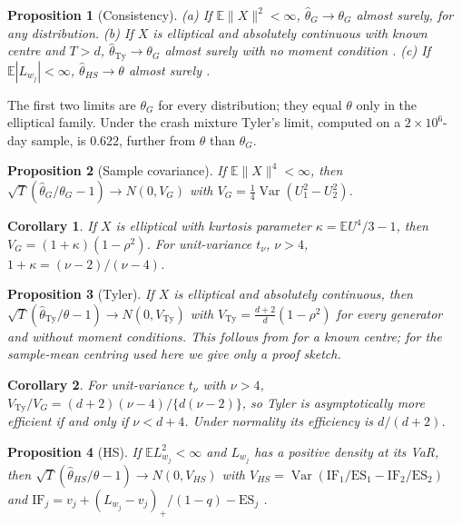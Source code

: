 \documentclass[11pt]{article}
\newcommand{\E}{\mathbb{E}}
\newcommand{\ES}{\mathrm{ES}}
\newcommand{\Var}{\operatorname{Var}}
\newtheorem{proposition}{Proposition}
\newtheorem{corollary}{Corollary}
\theoremstyle{remark}
\begin{document}
\begin{proposition}[Consistency]\label{prop:cons}
(a) If $\E\|X\|^2<\infty$, $\hat\theta_G\to\theta_G$ almost surely, for any distribution.
(b) If $X$ is elliptical and absolutely continuous with known centre and $T>d$, $\hat\theta_{\mathrm{Ty}}\to\theta_G$
almost surely with no moment condition \citep{tyler1987}.
(c) If $\E|L_{w_j}|<\infty$, $\hat\theta_{HS}\to\theta$ almost surely \citep{acerbi2002}.
\end{proposition}

The first two limits are $\theta_G$ for every distribution; they equal $\theta$ only in the elliptical family.
Under the crash mixture Tyler's limit, computed on a $2\times10^6$-day sample, is $0.622$, further from $\theta$
than $\theta_G$.

\begin{proposition}[Sample covariance]\label{prop:clt}
If $\E\|X\|^4<\infty$, then $\sqrt T(\hat\theta_G/\theta_G-1)\to N(0,V_G)$ with $V_G=\frac14\Var(U_1^2-U_2^2)$.
\end{proposition}

\begin{corollary}\label{cor:vg}
If $X$ is elliptical with kurtosis parameter $\kappa=\E U^4/3-1$, then $V_G=(1+\kappa)(1-\rho^2)$. For unit-variance
$t_\nu$, $\nu>4$, $1+\kappa=(\nu-2)/(\nu-4)$.
\end{corollary}

\begin{proposition}[Tyler]\label{prop:tyler}
If $X$ is elliptical and absolutely continuous, then $\sqrt T(\hat\theta_{\mathrm{Ty}}/\theta-1)\to
N(0,V_{\mathrm{Ty}})$ with $V_{\mathrm{Ty}}=\frac{d+2}d(1-\rho^2)$ for every generator and without moment
conditions. This follows from \citet{tyler1987} for a known centre; for the sample-mean centring used here we
give only a proof sketch.
\end{proposition}

\begin{corollary}\label{cor:eff}
For unit-variance $t_\nu$ with $\nu>4$, $V_{\mathrm{Ty}}/V_G=(d+2)(\nu-4)/\{d(\nu-2)\}$, so Tyler is
asymptotically more efficient if and only if $\nu<d+4$. Under normality its efficiency is $d/(d+2)$.
\end{corollary}

\begin{proposition}[HS]\label{prop:hs}
If $\E L_{w_j}^2<\infty$ and $L_{w_j}$ has a positive density at its VaR, then
$\sqrt T(\hat\theta_{HS}/\theta-1)\to N(0,V_{HS})$ with $V_{HS}=\Var(\mathrm{IF}_1/\ES_1-\mathrm{IF}_2/\ES_2)$
and $\mathrm{IF}_j=v_j+(L_{w_j}-v_j)_+/(1-q)-\ES_j$ \citep{chen2008}.
\end{proposition}
\end{document}
